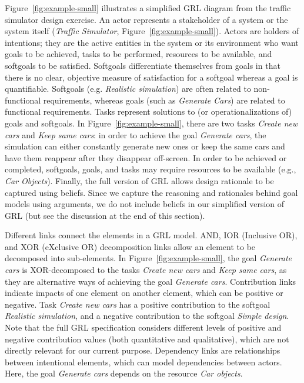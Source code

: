 Figure~\ref{fig:example-small} illustrates a simplified GRL diagram from the traffic simulator design exercise. An actor represents a stakeholder of a system or the system itself (\emph{Traffic Simulator}, Figure~\ref{fig:example-small}). Actors are holders of intentions; they are the active entities in the system or its environment who want goals to be achieved, tasks to be performed, resources to be available, and softgoals to be satisfied. Softgoals differentiate themselves from goals in that there is no clear, objective measure of satisfaction for a softgoal whereas a goal is quantifiable. Softgoals (e.g. \emph{Realistic simulation}) are often related to non-functional requirements, whereas goals (such as \emph{Generate Cars}) are related to functional requirements. Tasks represent solutions to (or operationalizations of) goals and softgoals. In Figure~\ref{fig:example-small}, there are two tasks \emph{Create new cars} and \emph{Keep same cars}: in order to achieve the goal \emph{Generate cars}, the simulation can either constantly generate new ones or keep the same cars and have them reappear after they disappear off-screen. In order to be achieved or completed, softgoals, goals, and tasks may require resources to be available (e.g., \emph{Car Objects}). Finally, the full version of GRL allows design rationale to be captured using beliefs. Since we capture the reasoning and rationales behind goal models using arguments, we do not include beliefs in our simplified version of GRL (but see the discussion at the end of this section).

Different links connect the elements in a GRL model. AND, IOR (Inclusive OR), and XOR (eXclusive OR) decomposition links allow an element to be decomposed into sub-elements. In Figure~\ref{fig:example-small}, the goal \emph{Generate cars} is XOR-decomposed to the tasks \emph{Create new cars} and \emph{Keep same cars}, as they are alternative ways of achieving the goal \emph{Generate cars}. Contribution links indicate impacts of one element on another element, which can be positive or negative. Task \emph{Create new cars} has a positive contribution to the softgoal \emph{Realistic simulation}, and a negative contribution to the softgoal \emph{Simple design}. Note that the full GRL specification considers different levels of positive and negative contribution values (both quantitative and qualitative), which are not directly relevant for our current purpose. Dependency links are relationships between intentional elements, which can model dependencies between actors. Here, the goal \emph{Generate cars} depends on the resource \emph{Car objects}. 

